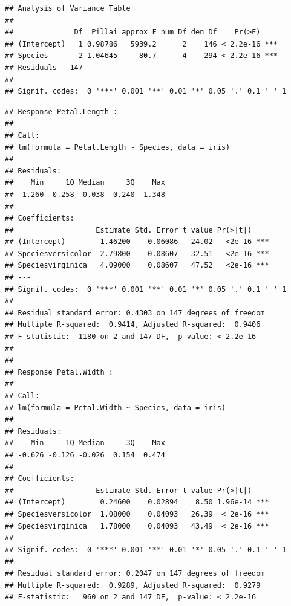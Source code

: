 \documentclass[krantz2]{krantz}\usepackage{knitr}
\begin{document}
\begin{knitrout}\footnotesize
{}\color{fgcolor}\begin{kframe}
\begin{alltt}
 \hlkwb{<-} \hlstd{(} \hlopt{~}    
\end{alltt}
\begin{verbatim}
## Analysis of Variance Table
##
##              Df  Pillai approx F num Df den Df    Pr(>F)
## (Intercept)   1 0.98786   5939.2      2    146 < 2.2e-16 ***
## Species       2 1.04645     80.7      4    294 < 2.2e-16 ***
## Residuals   147
## ---
## Signif. codes:  0 '***' 0.001 '**' 0.01 '*' 0.05 '.' 0.1 ' ' 1
\end{verbatim}
\begin{alltt}
\end{alltt}
\begin{verbatim}
## Response Petal.Length :
##
## Call:
## lm(formula = Petal.Length ~ Species, data = iris)
##
## Residuals:
##    Min     1Q Median     3Q    Max
## -1.260 -0.258  0.038  0.240  1.348
##
## Coefficients:
##                   Estimate Std. Error t value Pr(>|t|)
## (Intercept)        1.46200    0.06086   24.02   <2e-16 ***
## Speciesversicolor  2.79800    0.08607   32.51   <2e-16 ***
## Speciesvirginica   4.09000    0.08607   47.52   <2e-16 ***
## ---
## Signif. codes:  0 '***' 0.001 '**' 0.01 '*' 0.05 '.' 0.1 ' ' 1
##
## Residual standard error: 0.4303 on 147 degrees of freedom
## Multiple R-squared:  0.9414,	Adjusted R-squared:  0.9406
## F-statistic:  1180 on 2 and 147 DF,  p-value: < 2.2e-16
##
##
## Response Petal.Width :
##
## Call:
## lm(formula = Petal.Width ~ Species, data = iris)
##
## Residuals:
##    Min     1Q Median     3Q    Max
## -0.626 -0.126 -0.026  0.154  0.474
##
## Coefficients:
##                   Estimate Std. Error t value Pr(>|t|)
## (Intercept)        0.24600    0.02894    8.50 1.96e-14 ***
## Speciesversicolor  1.08000    0.04093   26.39  < 2e-16 ***
## Speciesvirginica   1.78000    0.04093   43.49  < 2e-16 ***
## ---
## Signif. codes:  0 '***' 0.001 '**' 0.01 '*' 0.05 '.' 0.1 ' ' 1
##
## Residual standard error: 0.2047 on 147 degrees of freedom
## Multiple R-squared:  0.9289,	Adjusted R-squared:  0.9279
## F-statistic:   960 on 2 and 147 DF,  p-value: < 2.2e-16
\end{verbatim}
\end{kframe}
\end{knitrout}
\end{document}
